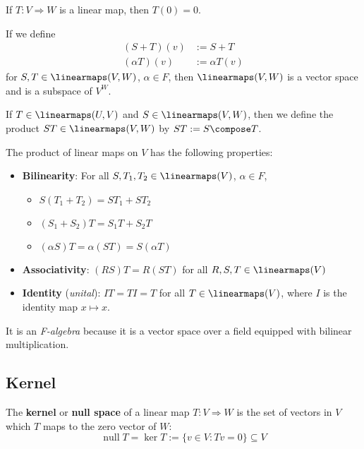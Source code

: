 \begin{lemma} If $T : V \Rightarrow W$ is a linear map, then $T(0) = 0$.
\end{lemma}

\begin{theorem}
  If we define
  \begin{align*}
    (S + T)(v) &:= S + T \\ 
    (\alpha T)(v) &:= \alpha T(v)
  \end{align*}
  for $S, T \in \linearmaps(V,W)$, $\alpha \in F$, then $\linearmaps(V,W)$ is a vector space and is a subspace of $V^W$.
\end{theorem}

\begin{definition}
  If $T \in \linearmaps(U, V)$ and $S \in \linearmaps(V, W)$, then we define the product $ST \in \linearmaps(V, W)$ by $ST := S \compose T$.
\end{definition}

\begin{theorem}
  The product of linear maps on $V$ has the following properties:
  \begin{itemize}
    \item \textbf{Bilinearity}: For all $S, T_1, T_2 \in \linearmaps(V)$, $\alpha \in F$,
    \begin{itemize}
      \item $S(T_1 + T_2) = ST_1 + ST_2$
      \item $(S_1 + S_2)T = S_1 T + S_2 T$
      \item $(\alpha S)T = \alpha(ST) = S(\alpha T)$
    \end{itemize}
    \item \textbf{Associativity}: $(RS)T = R(ST)$ for all $R, S, T \in \linearmaps(V)$
    \item \textbf{Identity} (\textit{unital}): $IT = TI = T$ for all $T \in \linearmaps(V)$, where $I$ is the identity map $x \mapsto x$.
  \end{itemize}
  It is an \textit{F-algebra} because it is a vector space over a field equipped with bilinear multiplication.
\end{theorem}

\subsection{Kernel}

\begin{definition}[Kernel]
  The \textbf{kernel} or \textbf{null space} of a linear map $T : V \Rightarrow W$ is the set of vectors in $V$ which $T$ maps to the zero vector of $W$:
  \[
    \operatorname{null} T = \ker T := \{ v \in V : Tv = 0 \} \subseteq V
  \]
\end{definition}

